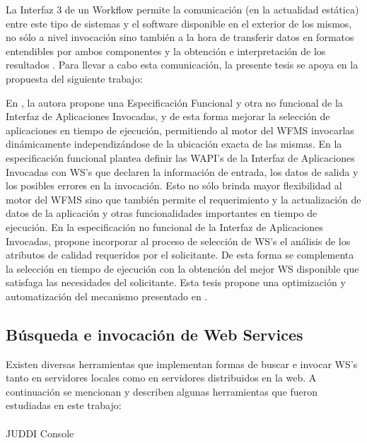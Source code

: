 La Interfaz 3 de un Workflow permite la comunicación (en la actualidad estática) entre este tipo de sistemas y el software disponible en el exterior de los mismos, no sólo a nivel invocación sino también a la hora de transferir datos en formatos entendibles por ambos componentes y la obtención e interpretación de los resultados \cite{WfMCb}. Para llevar a cabo esta comunicación, la presente tesis se apoya en la propuesta del siguiente trabajo:

En \cite{1}, la autora propone una Especificación Funcional y otra no funcional de la Interfaz de Aplicaciones Invocadas, y de esta forma mejorar la selección de aplicaciones en tiempo de ejecución, permitiendo al motor del WFMS invocarlas dinámicamente independizándose de la ubicación exacta de las mismas. En la especificación funcional plantea definir las WAPI's de la Interfaz de Aplicaciones Invocadas con WS's que declaren la información de entrada, los datos de salida y los posibles errores en la invocación. Esto no sólo brinda mayor flexibilidad al motor del WFMS sino que también permite el requerimiento y la actualización de datos de la aplicación y otras funcionalidades importantes en tiempo de ejecución. En la especificación no funcional de la Interfaz de Aplicaciones Invocadas, propone incorporar al proceso de selección de WS's el análisis de los atributos de calidad requeridos por el solicitante. De esta forma se complementa la selección en tiempo de ejecución con la obtención del mejor WS disponible que satisfaga las necesidades del solicitante. Esta tesis propone una optimización y automatización del mecanismo presentado en \cite{1}.

\subsection{Búsqueda e invocación de Web Services}
\label{Búsqueda e invocación de Web Services}

Existen diversas herramientas que implementan formas de buscar e invocar WS's tanto en servidores locales como en servidores distribuidos en la web. A continuación se mencionan y describen algunas herramientas que fueron estudiadas en este trabajo:\\\\

JUDDI Console\\\\

